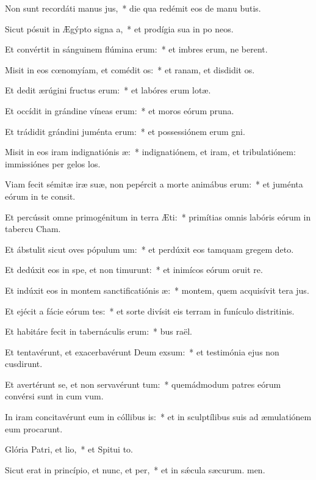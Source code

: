 \item Non sunt recordáti manus jus,~* die qua redémit eos de manu butis.
\item Sicut pósuit in Ægýpto signa a,~* et prodígia sua in po neos.
\item Et convértit in sánguinem flúmina erum:~* et imbres erum, ne berent.
\item Misit in eos cœnomyíam, et comédit os:~* et ranam, et disdidit os.
\item Et dedit ærúgini fructus erum:~* et labóres erum lotæ.
\item Et occídit in grándine víneas erum:~* et moros eórum  pruna.
\item Et trádidit grándini juménta erum:~* et possessiónem erum gni.
\item Misit in eos iram indignatiónis æ:~* indignatiónem, et iram, et tribulatiónem: immissiónes per gelos los.
\item Viam fecit sémitæ iræ suæ, non pepércit a morte animábus erum:~* et juménta eórum in te consit.
\item Et percússit omne primogénitum in terra Æti:~* primítias omnis labóris eórum in tabercu Cham.
\item Et ábstulit sicut oves pópulum um:~* et perdúxit eos tamquam gregem  deto.
\item Et dedúxit eos in spe, et non timurunt:~* et inimícos eórum oruit re.
\item Et indúxit eos in montem sanctificatiónis æ:~* montem, quem acquisívit tera jus.
\item Et ejécit a fácie eórum tes:~* et sorte divísit eis terram in funículo distritinis.
\item Et habitáre fecit in tabernáculis erum:~* bus raël.
\item Et tentavérunt, et exacerbavérunt Deum exsum:~* et testimónia ejus non cusdirunt.
\item Et avertérunt se, et non servavérunt tum:~* quemádmodum patres eórum convérsi sunt in cum vum.
\item In iram concitavérunt eum in cóllibus is:~* et in sculptílibus suis ad æmulatiónem eum procarunt.
\item Glória Patri, et lio,~* et Spitui to.
\item Sicut erat in princípio, et nunc, et per,~* et in sǽcula sæcurum. men.
